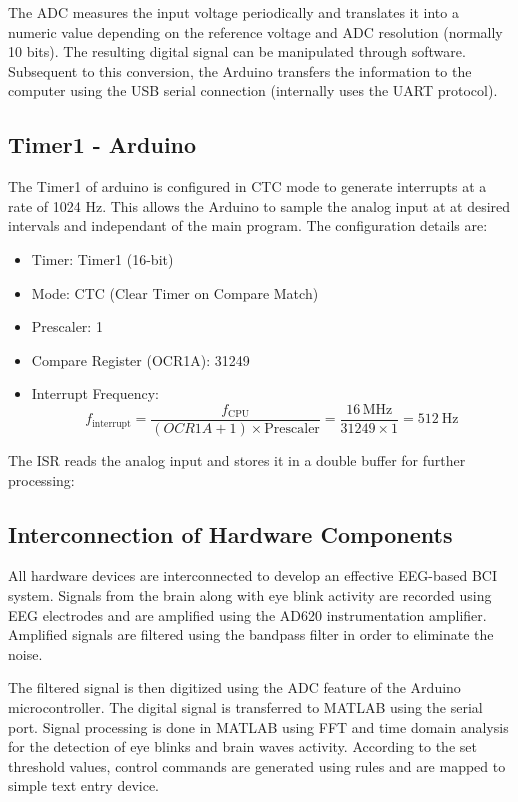 The ADC measures the input voltage periodically and translates it into a numeric value depending on the reference voltage and ADC resolution (normally 10 bits). The resulting digital signal can be manipulated through software. Subsequent to this conversion, the Arduino transfers the information to the computer using the USB serial connection (internally uses the UART protocol).

\subsection{Timer1 - Arduino}
The Timer1 of arduino is configured in CTC mode to generate interrupts at a rate of 1024 Hz. This allows the Arduino to sample the analog input at at desired intervals and independant of the main program. The configuration details are:

\begin{itemize}
	\item {Timer:} Timer1 (16-bit)
	\item {Mode:} CTC (Clear Timer on Compare Match)
	\item {Prescaler:} 1
	\item {Compare Register (OCR1A):} 31249
	\item {Interrupt Frequency:} 
	\[
	f_\text{interrupt} = \frac{f_\text{CPU}}{(OCR1A + 1) \times \text{Prescaler}} 
	= \frac{16\,\text{MHz}}{31249 \times 1} = 512~\text{Hz}
	\]
\end{itemize}

\noindent The ISR reads the analog input and stores it in a double buffer for further processing:

\subsection{Interconnection of Hardware Components}
All hardware devices are interconnected to develop an effective EEG-based BCI system. Signals from the brain along with eye blink activity are recorded using EEG electrodes and are amplified using the AD620 instrumentation amplifier. Amplified signals are filtered using the bandpass filter in order to eliminate the noise.

The filtered signal is then digitized using the ADC feature of the Arduino microcontroller. The digital signal is transferred to MATLAB using the serial port. Signal processing is done in MATLAB using FFT and time domain analysis for the detection of eye blinks and brain waves activity. According to the set threshold values, control commands are generated using rules and are mapped to simple text entry device.

